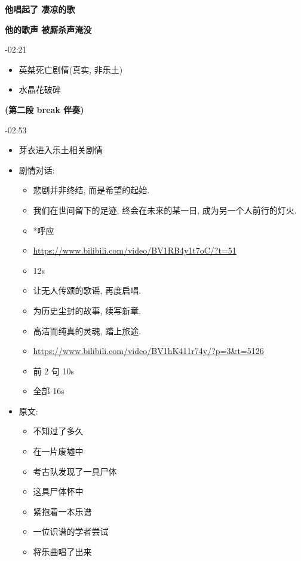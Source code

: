 \documentclass[a4paper]{article}
\begin{document}
\textbf{他唱起了 凄凉的歌}

\textbf{他的歌声 被厮杀声淹没}

-02:21

\begin{itemize}
    \item 英桀死亡剧情(真实, 非乐土)
    \item 水晶花破碎
\end{itemize}

\textbf{(第二段 break 伴奏)}

-02:53

\begin{itemize}
    \item 芽衣进入乐土相关剧情
    \item 剧情对话:
    \begin{itemize}
        \item 悲剧并非终结, 而是希望的起始.
        \item 我们在世间留下的足迹, 终会在未来的某一日, 成为另一个人前行的灯火.
        \item *呼应
        \item \url{https://www.bilibili.com/video/BV1RB4y1t7oC/?t=51}
        \item 12s
    \end{itemize}
    \begin{itemize}
        \item 让无人传颂的歌谣, 再度启唱.
        \item 为历史尘封的故事, 续写新章.
        \item 高洁而纯真的灵魂, 踏上旅途.
        \item \url{https://www.bilibili.com/video/BV1hK411r74y/?p=3&t=5126}
        \item 前 2 句 10s
        \item 全部 16s
    \end{itemize}
    \item 原文:
    \begin{itemize}
        \item 不知过了多久
        \item 在一片废墟中
        \item 考古队发现了一具尸体
        \item 这具尸体怀中
        \item 紧抱着一本乐谱
        \item 一位识谱的学者尝试
        \item 将乐曲唱了出来
    \end{itemize}
\end{itemize}
\end{document}

